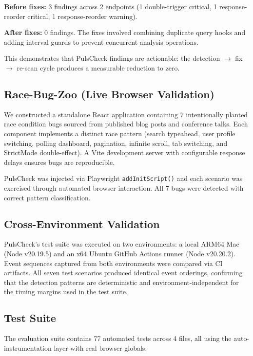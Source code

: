 \documentclass[11pt,a4paper]{article}
\begin{document}
\textbf{Before fixes:} 3 findings across 2 endpoints (1 double-trigger critical, 1 response-reorder critical, 1 response-reorder warning).

\textbf{After fixes:} 0 findings. The fixes involved combining duplicate query hooks and adding interval guards to prevent concurrent analysis operations.

This demonstrates that PulsCheck findings are actionable: the detection $\rightarrow$ fix $\rightarrow$ re-scan cycle produces a measurable reduction to zero.

\subsection{Race-Bug-Zoo (Live Browser Validation)}

We constructed a standalone React application containing 7 intentionally planted race condition bugs sourced from published blog posts and conference talks. Each component implements a distinct race pattern (search typeahead, user profile switching, polling dashboard, pagination, infinite scroll, tab switching, and StrictMode double-effect). A Vite development server with configurable response delays ensures bugs are reproducible.

PulsCheck was injected via Playwright \texttt{addInitScript()} and each scenario was exercised through automated browser interaction. All 7 bugs were detected with correct pattern classification.

\subsection{Cross-Environment Validation}

PulsCheck's test suite was executed on two environments: a local ARM64 Mac (Node v20.19.5) and an x64 Ubuntu GitHub Actions runner (Node v20.20.2). Event sequences captured from both environments were compared via CI artifacts. All seven test scenarios produced identical event orderings, confirming that the detection patterns are deterministic and environment-independent for the timing margins used in the test suite.

\subsection{Test Suite}

The evaluation suite contains 77 automated tests across 4 files, all using the auto-instrumentation layer with real browser globals:
\end{document}
